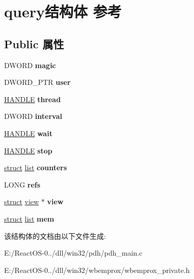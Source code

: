 \hypertarget{structquery}{}\section{query结构体 参考}
\label{structquery}
\subsection*{Public 属性}
\begin{DoxyCompactItemize}
\item 
\mbox{\label{structquery_ab1bbd50c9bd114d9676f483681d03373}} 
D\+W\+O\+RD {\bfseries magic}
\item 
\mbox{\label{structquery_a8d06bbf5c0da724fda37297a628cb5de}} 
D\+W\+O\+R\+D\+\_\+\+P\+TR {\bfseries user}
\item 
\mbox{\label{structquery_ac56efc178e1e8dcb2de3524ae63cb5cd}} 
\hyperlink{interfacevoid}{H\+A\+N\+D\+LE} {\bfseries thread}
\item 
\mbox{\label{structquery_acf55b15ff6619b35ed4eb7545c41966c}} 
D\+W\+O\+RD {\bfseries interval}
\item 
\mbox{\label{structquery_a6f866464f137dc9396186c70f8be7fe5}} 
\hyperlink{interfacevoid}{H\+A\+N\+D\+LE} {\bfseries wait}
\item 
\mbox{\label{structquery_aed4012aeed0c173a3dff78b5edfa6f90}} 
\hyperlink{interfacevoid}{H\+A\+N\+D\+LE} {\bfseries stop}
\item 
\mbox{\label{structquery_a63d47fd3d38b99a60b9bedc0a0ff3458}} 
\hyperlink{interfacestruct}{struct} \hyperlink{classlist}{list} {\bfseries counters}
\item 
\mbox{\label{structquery_a44359e372fb99dddfa65a591170afb73}} 
L\+O\+NG {\bfseries refs}
\item 
\mbox{\label{structquery_acfe90e773928a903dca9a1475c05a89a}} 
\hyperlink{interfacestruct}{struct} \hyperlink{structview}{view} $\ast$ {\bfseries view}
\item 
\mbox{\label{structquery_a7f65316c885729f4cf5b4a667445b90c}} 
\hyperlink{interfacestruct}{struct} \hyperlink{classlist}{list} {\bfseries mem}
\end{DoxyCompactItemize}


该结构体的文档由以下文件生成\+:\begin{DoxyCompactItemize}
\item 
E\+:/\+React\+O\+S-\/0../dll/win32/pdh/pdh\+\_\+main.\+c\item 
E\+:/\+React\+O\+S-\/0../dll/win32/wbemprox/wbemprox\+\_\+private.\+h\end{DoxyCompactItemize}
